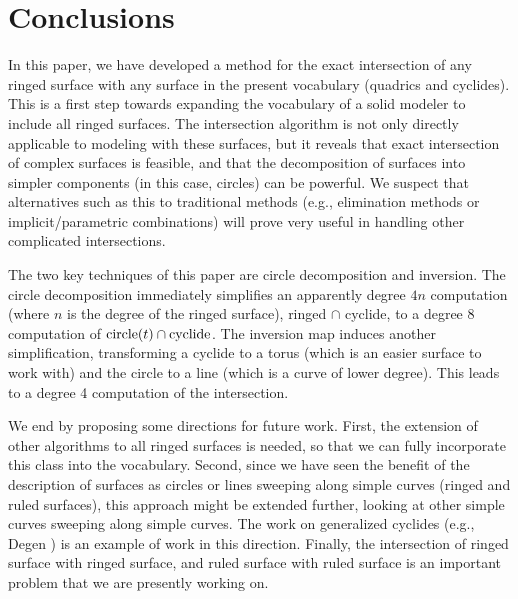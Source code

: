 
%
%
%


% 

\section{Conclusions}
\label{sec:conc}

In this paper, we have developed a method for the exact intersection of any
ringed surface with any surface in the present vocabulary (quadrics and
cyclides).
This is a first step towards expanding the vocabulary 
of a solid modeler to include all ringed surfaces.
The intersection algorithm is not only directly applicable 
to modeling with these surfaces,
but it reveals that exact intersection of complex surfaces is feasible,
and that the decomposition of surfaces into simpler components
(in this case, circles) can be powerful.
We suspect that alternatives such as this to 
traditional methods (e.g., elimination methods or implicit/parametric
combinations) will prove very useful in handling other complicated
intersections.

The two key techniques of this paper are circle decomposition and inversion.
The circle decomposition immediately simplifies an apparently degree $4n$
computation (where $n$ is the degree of the ringed surface),
ringed $\cap$ cyclide, 
to a degree 8 computation of ${\rm circle}(t) \cap {\rm cyclide}$.
The inversion map induces another simplification,
transforming a cyclide to a torus (which is an easier surface to work with)
and the circle to a line (which is a curve of lower degree).
This leads to a degree 4 computation of the intersection.

We end by proposing some directions for future work.
First, the extension of other algorithms to all ringed surfaces is needed,
so that we can fully incorporate this class into the vocabulary.
Second, since we have seen the benefit of the description of surfaces 
as circles or lines sweeping along simple curves (ringed and ruled surfaces),
this approach might be extended further, looking at other simple curves
sweeping along simple curves.
The work on generalized cyclides (e.g., Degen \cite{Degen90}) 
is an example of work in this direction.
Finally, the intersection of ringed surface with ringed surface, 
and ruled surface with ruled surface is an important problem that we are 
presently working on.




